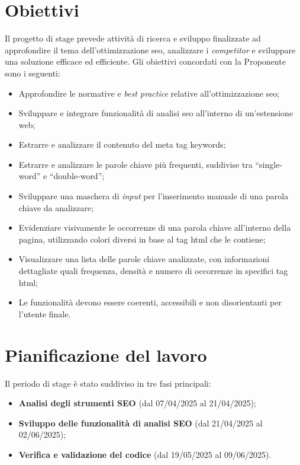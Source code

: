 \section{Obiettivi}
\label{sec:obiettivi}

\par Il progetto di stage prevede attività di ricerca e sviluppo finalizzate ad approfondire il tema dell’ottimizzazione \gls{seo}, analizzare i \textit{competitor} e sviluppare una soluzione efficace ed efficiente. Gli obiettivi concordati con la Proponente sono i seguenti:

\begin{itemize}
  \item Approfondire le normative e \textit{best practice} relative all’ottimizzazione \gls{seo};
  \item Sviluppare e integrare funzionalità di analisi \gls{seo} all’interno di un’estensione web;
  \item Estrarre e analizzare il contenuto del meta tag keywords;
  \item Estrarre e analizzare le parole chiave più frequenti, suddivise tra “single-word” e “double-word”;
  \item Sviluppare una maschera di \textit{input} per l’inserimento manuale di una parola chiave da analizzare;
  \item Evidenziare visivamente le occorrenze di una parola chiave all’interno della pagina, utilizzando colori diversi in base al tag \gls{html} che le contiene;
  \item Visualizzare una lista delle parole chiave analizzate, con informazioni dettagliate quali frequenza, densità e numero di occorrenze in specifici tag \gls{html};
  \item Le funzionalità devono essere coerenti, accessibili e non disorientanti per l’utente finale.
\end{itemize}

\section{Pianificazione del lavoro}
\label{sec:pianificazione}

\par Il periodo di stage è stato suddiviso in tre fasi principali:
\begin{itemize}
  \item \textbf{Analisi degli strumenti SEO} (dal 07/04/2025 al 21/04/2025);
  \item \textbf{Sviluppo delle funzionalità di analisi SEO} (dal 21/04/2025 al 02/06/2025);
  \item \textbf{Verifica e validazione del codice} (dal 19/05/2025 al 09/06/2025).
\end{itemize}

